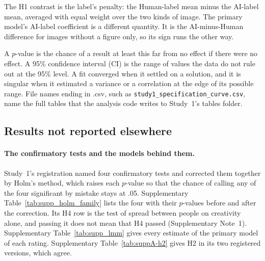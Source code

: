The H1 contrast is the label's penalty: the Human-label mean minus the AI-label mean, averaged with equal weight over the two kinds of image. The primary model's AI-label coefficient is a different quantity. It is the AI-minus-Human difference for images without a figure only, so its sign runs the other way.

A $p$-value is the chance of a result at least this far from no effect if there were no effect. A 95\% confidence interval (CI) is the range of values the data do not rule out at the 95\% level. A fit converged when it settled on a solution, and it is singular when it estimated a variance or a correlation at the edge of its possible range. File names ending in .csv, such as \nolinkurl{study1_specification_curve.csv}, name the full tables that the analysis code writes to Study~1's tables folder.

\subsection*{Results not reported elsewhere}

\paragraph*{The confirmatory tests and the models behind them.}
Study~1's registration named four confirmatory tests and corrected them together by Holm's method,\cite{holm1979simple} which raises each $p$-value so that the chance of calling any of the four significant by mistake stays at .05. Supplementary Table~\ref{tab:supp_holm_family} lists the four with their $p$-values before and after the correction. Its H4 row is the test of spread between people on creativity alone, and passing it does not mean that H4 passed (Supplementary Note~1). Supplementary Table~\ref{tab:supp_lmm} gives every estimate of the primary model of each rating. Supplementary Table~\ref{tab:suppA-h2} gives H2 in its two registered versions, which agree.





